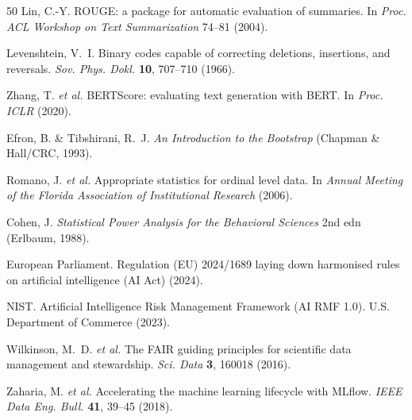 \documentclass[sn-nature]{sn-jnl}
\begin{document}
\begin{thebibliography}{50}
Lin, C.-Y.
ROUGE: a package for automatic evaluation of summaries.
In \emph{Proc. ACL Workshop on Text Summarization} 74--81 (2004).

Levenshtein, V.~I.
Binary codes capable of correcting deletions, insertions, and reversals.
\emph{Sov. Phys. Dokl.} \textbf{10}, 707--710 (1966).

Zhang, T. \emph{et al.}
BERTScore: evaluating text generation with BERT.
In \emph{Proc. ICLR} (2020).

Efron, B. \& Tibshirani, R.~J.
\emph{An Introduction to the Bootstrap} (Chapman \& Hall/CRC, 1993).

Romano, J. \emph{et al.}
Appropriate statistics for ordinal level data.
In \emph{Annual Meeting of the Florida Association of Institutional Research} (2006).

Cohen, J.
\emph{Statistical Power Analysis for the Behavioral Sciences} 2nd edn (Erlbaum, 1988).

European Parliament.
Regulation (EU) 2024/1689 laying down harmonised rules on artificial intelligence (AI Act) (2024).

NIST.
Artificial Intelligence Risk Management Framework (AI RMF 1.0).
U.S. Department of Commerce (2023).

Wilkinson, M.~D. \emph{et al.}
The FAIR guiding principles for scientific data management and stewardship.
\emph{Sci. Data} \textbf{3}, 160018 (2016).

Zaharia, M. \emph{et al.}
Accelerating the machine learning lifecycle with MLflow.
\emph{IEEE Data Eng. Bull.} \textbf{41}, 39--45 (2018).

\end{thebibliography}
\end{document}

